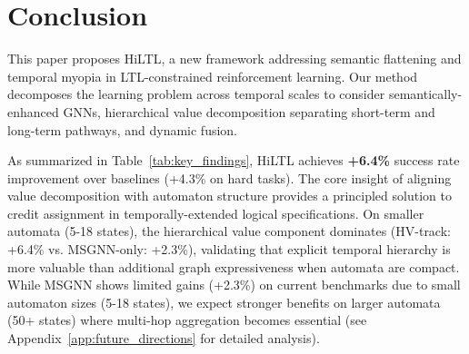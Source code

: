 \documentclass{article}
\begin{document}
\begin{table}[t]
\centering
\caption{Key Findings In Experiments}
\label{tab:key_findings}
\end{table}

\section{Conclusion}
\label{sec:conclusion}

This paper proposes HiLTL, a new framework addressing semantic flattening and temporal myopia in LTL-constrained reinforcement learning. Our method decomposes the learning problem across temporal scales to consider semantically-enhanced GNNs, hierarchical value decomposition separating short-term and long-term pathways, and dynamic fusion.

As summarized in Table~\ref{tab:key_findings}, HiLTL achieves \textbf{+6.4\%} success rate improvement over baselines (+4.3\% on hard tasks). The core insight of aligning value decomposition with automaton structure provides a principled solution to credit assignment in temporally-extended logical specifications. On smaller automata (5-18 states), the hierarchical value component dominates (HV-track: +6.4\% vs. MSGNN-only: +2.3\%), validating that explicit temporal hierarchy is more valuable than additional graph expressiveness when automata are compact. While MSGNN shows limited gains (+2.3\%) on current benchmarks due to small automaton sizes (5-18 states), we expect stronger benefits on larger automata (50+ states) where multi-hop aggregation becomes essential (see Appendix~\ref{app:future_directions} for detailed analysis).
\end{document}
